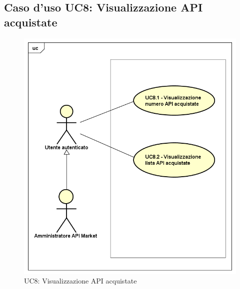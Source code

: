 \newpage
\subsection{Caso d'uso UC8: Visualizzazione API acquistate}
\label{UC8}
\begin{figure}[ht]
	\centering
	\includegraphics[scale=0.45]{UML/UC8.png}
	\caption{UC8: Visualizzazione API acquistate}
\end{figure}

